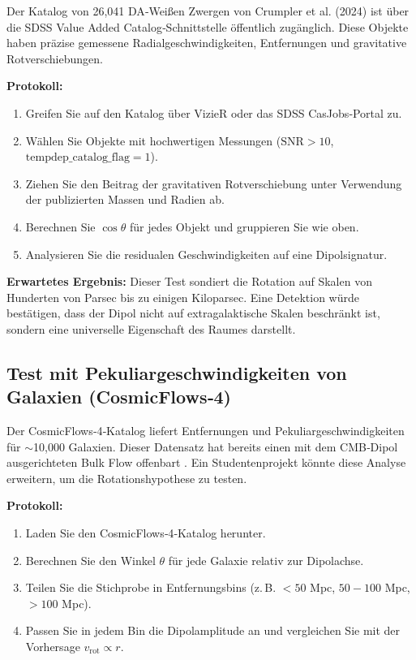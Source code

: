 \documentclass[11pt,a4paper]{article}
\begin{document}
	Der Katalog von 26,041 DA‑Weißen Zwergen von Crumpler et al. (2024) ist über die SDSS Value Added Catalog‑Schnittstelle öffentlich zugänglich. Diese Objekte haben präzise gemessene Radialgeschwindigkeiten, Entfernungen und gravitative Rotverschiebungen.
	
	\textbf{Protokoll:}
	\begin{enumerate}
		\item Greifen Sie auf den Katalog über VizieR oder das SDSS CasJobs‑Portal zu.
		\item Wählen Sie Objekte mit hochwertigen Messungen (\(\mathrm{SNR} > 10\), \(\mathrm{tempdep\_catalog\_flag} = 1\)).
		\item Ziehen Sie den Beitrag der gravitativen Rotverschiebung unter Verwendung der publizierten Massen und Radien ab.
		\item Berechnen Sie \(\cos\theta\) für jedes Objekt und gruppieren Sie wie oben.
		\item Analysieren Sie die residualen Geschwindigkeiten auf eine Dipolsignatur.
	\end{enumerate}
	
	\textbf{Erwartetes Ergebnis:} Dieser Test sondiert die Rotation auf Skalen von Hunderten von Parsec bis zu einigen Kiloparsec. Eine Detektion würde bestätigen, dass der Dipol nicht auf extragalaktische Skalen beschränkt ist, sondern eine universelle Eigenschaft des Raumes darstellt.
	
	\subsection{Test mit Pekuliargeschwindigkeiten von Galaxien (CosmicFlows‑4)}
	
	Der CosmicFlows‑4‑Katalog liefert Entfernungen und Pekuliargeschwindigkeiten für \(\sim\)10,000 Galaxien. Dieser Datensatz hat bereits einen mit dem CMB‑Dipol ausgerichteten Bulk Flow offenbart \cite{Watkins2023}. Ein Studentenprojekt könnte diese Analyse erweitern, um die Rotationshypothese zu testen.
	
	\textbf{Protokoll:}
	\begin{enumerate}
		\item Laden Sie den CosmicFlows‑4‑Katalog herunter.
		\item Berechnen Sie den Winkel \(\theta\) für jede Galaxie relativ zur Dipolachse.
		\item Teilen Sie die Stichprobe in Entfernungsbins (z. B. \(<50\) Mpc, \(50-100\) Mpc, \(>100\) Mpc).
		\item Passen Sie in jedem Bin die Dipolamplitude an und vergleichen Sie mit der Vorhersage \(v_{\mathrm{rot}} \propto r\).
	\end{enumerate}
	
\end{document}
